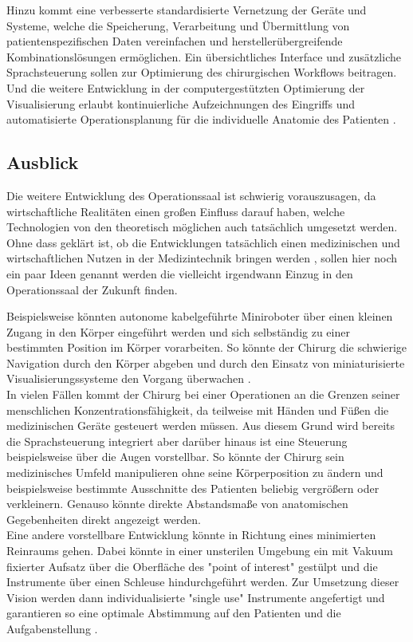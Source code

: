 Hinzu kommt eine verbesserte standardisierte Vernetzung der Geräte und Systeme, welche die Speicherung, Verarbeitung und Übermittlung von patientenspezifischen Daten vereinfachen und herstellerübergreifende Kombinationslösungen ermöglichen. Ein übersichtliches Interface und zusätzliche Sprachsteuerung sollen zur Optimierung des chirurgischen Workflows beitragen. Und die weitere Entwicklung in der computergestützten Optimierung der Visualisierung erlaubt kontinuierliche Aufzeichnungen des Eingriffs \cite{DerDigitaleOperationssaal} und automatisierte Operationsplanung für die individuelle Anatomie des Patienten \cite{CurrentAndFuture}. 

\subsection{Ausblick}

Die weitere Entwicklung des Operationssaal ist schwierig vorauszusagen, da wirtschaftliche Realitäten einen großen Einfluss darauf haben, welche Technologien von den theoretisch möglichen auch tatsächlich umgesetzt werden. Ohne dass geklärt ist, ob die Entwicklungen tatsächlich einen medizinischen und wirtschaftlichen Nutzen in der Medizintechnik bringen werden \cite{DerDigitaleOperationssaal}, sollen hier noch ein paar Ideen genannt werden die vielleicht irgendwann Einzug in den Operationssaal der Zukunft finden.

Beispielsweise könnten autonome kabelgeführte Miniroboter über einen kleinen Zugang in den Körper eingeführt werden und sich selbständig zu einer bestimmten Position im Körper vorarbeiten. So könnte der Chirurg die schwierige Navigation durch den Körper abgeben und durch den Einsatz von miniaturisierte Visualisierungssysteme den Vorgang überwachen .\\
In vielen Fällen kommt der Chirurg bei einer Operationen an die Grenzen seiner menschlichen Konzentrationsfähigkeit, da teilweise mit Händen und Füßen die medizinischen Geräte gesteuert werden müssen. Aus diesem Grund wird bereits die Sprachsteuerung integriert aber darüber hinaus ist eine Steuerung beispielsweise über die Augen vorstellbar. So könnte der Chirurg sein medizinisches Umfeld manipulieren ohne seine Körperposition zu ändern und beispielsweise bestimmte Ausschnitte des Patienten beliebig vergrößern oder verkleinern. Genauso könnte direkte Abstandsmaße von anatomischen Gegebenheiten direkt angezeigt werden. \\
Eine andere vorstellbare Entwicklung könnte in Richtung eines minimierten Reinraums gehen. Dabei könnte in einer unsterilen Umgebung ein mit Vakuum fixierter Aufsatz über die Oberfläche des "point of interest" gestülpt und die Instrumente über einen Schleuse hindurchgeführt werden. Zur Umsetzung dieser Vision werden dann individualisierte "single use" Instrumente angefertigt und garantieren so eine optimale Abstimmung auf den Patienten und die Aufgabenstellung \cite{DerDigitaleOperationssaal}.

